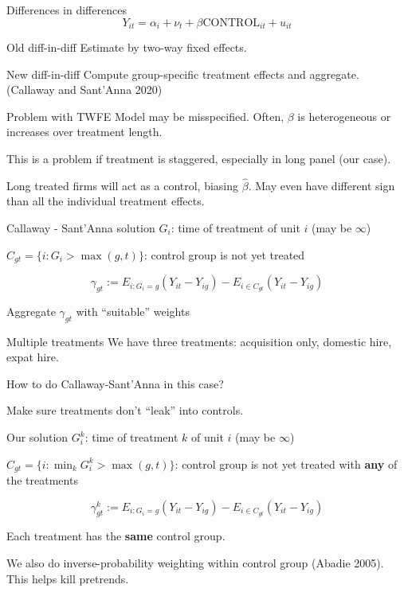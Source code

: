 \documentclass[
  ignorenonframetext,
  aspectratio=43,
]{beamer}
\begin{document}
\begin{frame}{Differences in differences}
\protect\hypertarget{differences-in-differences}{}
\[
Y_{it} = \alpha_i + \nu_t + \beta \text{CONTROL}_{it} + u_{it}
\]

\begin{block}{Old diff-in-diff}
\protect\hypertarget{old-diff-in-diff}{}
Estimate by two-way fixed effects.
\end{block}

\begin{block}{New diff-in-diff}
\protect\hypertarget{new-diff-in-diff}{}
Compute group-specific treatment effects and aggregate. (Callaway and
Sant'Anna 2020)
\end{block}
\end{frame}

\begin{frame}{Problem with TWFE}
\protect\hypertarget{problem-with-twfe}{}
Model may be misspecified. Often, \(\beta\) is heterogeneous or
increases over treatment length.

This is a problem if treatment is staggered, especially in long panel
(our case).

Long treated firms will act as a control, biasing \(\hat\beta\). May
even have different sign than all the individual treatment effects.
\end{frame}

\begin{frame}{Callaway - Sant'Anna solution}
\protect\hypertarget{callaway---santanna-solution}{}
\(G_{i}\): time of treatment of unit \(i\) (may be \(\infty\))

\(C_{gt} = \{i: G_i > \max(g,t)\}\): control group is not yet treated

\[
\gamma_{gt} := E_{i: G_i=g} (Y_{it} - Y_{ig})
- E_{i\in C_{gt}} (Y_{it} - Y_{ig})
\]

Aggregate \(\gamma_{gt}\) with ``suitable'' weights
\end{frame}

\begin{frame}{Multiple treatments}
\protect\hypertarget{multiple-treatments}{}
We have three treatments: acquisition only, domestic hire, expat hire.

How to do Callaway-Sant'Anna in this case?

Make sure treatments don't ``leak'' into controls.
\end{frame}

\begin{frame}{Our solution}
\protect\hypertarget{our-solution}{}
\(G_{i}^k\): time of treatment \(k\) of unit \(i\) (may be \(\infty\))

\(C_{gt} = \{i: \min_k G_i^k > \max(g,t)\}\): control group is not yet
treated with \textbf{any} of the treatments

\[
\gamma_{gt}^k := E_{i: G_i=g} (Y_{it} - Y_{ig})
- E_{i\in C_{gt}} (Y_{it} - Y_{ig})
\]

Each treatment has the \textbf{same} control group.

We also do inverse-probability weighting within control group (Abadie
2005). This helps kill pretrends.
\end{frame}
\end{document}

